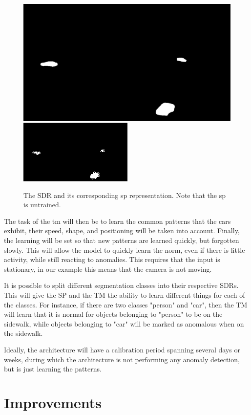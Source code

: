 \begin{figure}[H]
    \centering
    \includegraphics[width=.48\textwidth]{resources/methodology/car_segmentation.png}
    \includegraphics[width=.48\textwidth]{resources/methodology/car_segmentation_sp.png}
    \caption{The SDR and its corresponding \gls*{sp} representation. Note that the \gls*{sp} is untrained.}
\end{figure}
\par
The task of the \gls*{tm} will then be to learn the common patterns that the cars exhibit, their speed, shape, and positioning will be taken into account. Finally, the learning will be set so that new patterns are learned quickly, but forgotten slowly. This will allow the model to quickly learn the norm, even if there is little activity, while still reacting to anomalies. This requires that the input is stationary, in our example this means that the camera is not moving.
\par
It is possible to split different segmentation classes into their respective SDRs. This will give the SP and the TM the ability to learn different things for each of the classes. For instance, if there are two classes "person" and "car", then the TM will learn that it is normal for objects belonging to "person" to be on the sidewalk, while objects belonging to "car" will be marked as anomalous when on the sidewalk.
\par
Ideally, the architecture will have a calibration period spanning several days or weeks, during which the architecture is not performing any anomaly detection, but is just learning the patterns.
\section{Improvements}
